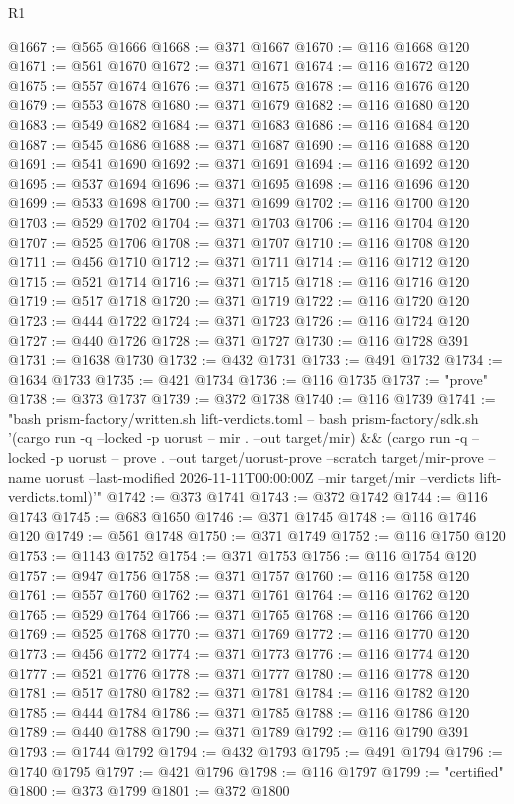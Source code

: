 \begin{lexlean}{R1}
\begin{coremodule}
@1667 := @565 @1666
@1668 := @371 @1667
@1670 := @116 @1668 @120
@1671 := @561 @1670
@1672 := @371 @1671
@1674 := @116 @1672 @120
@1675 := @557 @1674
@1676 := @371 @1675
@1678 := @116 @1676 @120
@1679 := @553 @1678
@1680 := @371 @1679
@1682 := @116 @1680 @120
@1683 := @549 @1682
@1684 := @371 @1683
@1686 := @116 @1684 @120
@1687 := @545 @1686
@1688 := @371 @1687
@1690 := @116 @1688 @120
@1691 := @541 @1690
@1692 := @371 @1691
@1694 := @116 @1692 @120
@1695 := @537 @1694
@1696 := @371 @1695
@1698 := @116 @1696 @120
@1699 := @533 @1698
@1700 := @371 @1699
@1702 := @116 @1700 @120
@1703 := @529 @1702
@1704 := @371 @1703
@1706 := @116 @1704 @120
@1707 := @525 @1706
@1708 := @371 @1707
@1710 := @116 @1708 @120
@1711 := @456 @1710
@1712 := @371 @1711
@1714 := @116 @1712 @120
@1715 := @521 @1714
@1716 := @371 @1715
@1718 := @116 @1716 @120
@1719 := @517 @1718
@1720 := @371 @1719
@1722 := @116 @1720 @120
@1723 := @444 @1722
@1724 := @371 @1723
@1726 := @116 @1724 @120
@1727 := @440 @1726
@1728 := @371 @1727
@1730 := @116 @1728 @391
@1731 := @1638 @1730
@1732 := @432 @1731
@1733 := @491 @1732
@1734 := @1634 @1733
@1735 := @421 @1734
@1736 := @116 @1735
@1737 := "prove"
@1738 := @373 @1737
@1739 := @372 @1738
@1740 := @116 @1739
@1741 := "bash prism-factory/written.sh lift-verdicts.toml -- bash prism-factory/sdk.sh '(cargo run -q --locked -p uorust -- mir . --out target/mir) && (cargo run -q --locked -p uorust -- prove . --out target/uorust-prove --scratch target/mir-prove --name uorust --last-modified 2026-11-11T00:00:00Z --mir target/mir --verdicts lift-verdicts.toml)'"
@1742 := @373 @1741
@1743 := @372 @1742
@1744 := @116 @1743
@1745 := @683 @1650
@1746 := @371 @1745
@1748 := @116 @1746 @120
@1749 := @561 @1748
@1750 := @371 @1749
@1752 := @116 @1750 @120
@1753 := @1143 @1752
@1754 := @371 @1753
@1756 := @116 @1754 @120
@1757 := @947 @1756
@1758 := @371 @1757
@1760 := @116 @1758 @120
@1761 := @557 @1760
@1762 := @371 @1761
@1764 := @116 @1762 @120
@1765 := @529 @1764
@1766 := @371 @1765
@1768 := @116 @1766 @120
@1769 := @525 @1768
@1770 := @371 @1769
@1772 := @116 @1770 @120
@1773 := @456 @1772
@1774 := @371 @1773
@1776 := @116 @1774 @120
@1777 := @521 @1776
@1778 := @371 @1777
@1780 := @116 @1778 @120
@1781 := @517 @1780
@1782 := @371 @1781
@1784 := @116 @1782 @120
@1785 := @444 @1784
@1786 := @371 @1785
@1788 := @116 @1786 @120
@1789 := @440 @1788
@1790 := @371 @1789
@1792 := @116 @1790 @391
@1793 := @1744 @1792
@1794 := @432 @1793
@1795 := @491 @1794
@1796 := @1740 @1795
@1797 := @421 @1796
@1798 := @116 @1797
@1799 := "certified"
@1800 := @373 @1799
@1801 := @372 @1800

\end{coremodule}
\end{lexlean}
